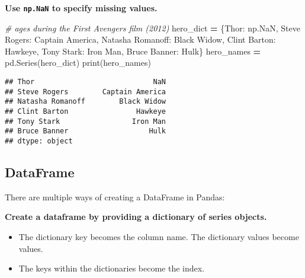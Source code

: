 \documentclass[
]{book}
\newenvironment{Shaded}{\begin{snugshade}}{\end{snugshade}}
\newcommand{\BuiltInTok}[1]{#1}
\newcommand{\CommentTok}[1]{\textcolor[rgb]{0.56,0.35,0.01}{\textit{#1}}}
\newcommand{\NormalTok}[1]{#1}
\newcommand{\OperatorTok}[1]{\textcolor[rgb]{0.81,0.36,0.00}{\textbf{#1}}}
\newcommand{\StringTok}[1]{\textcolor[rgb]{0.31,0.60,0.02}{#1}}
\begin{document}
\textbf{Use \texttt{np.NaN} to specify missing values.}

\begin{Shaded}
\begin{Highlighting}[]
\CommentTok{\# ages during the First Avengers film (2012)}
\NormalTok{hero\_dict }\OperatorTok{=}\NormalTok{ \{}\StringTok{\textquotesingle{}Thor\textquotesingle{}}\NormalTok{: np.NaN,}
\StringTok{\textquotesingle{}Steve Rogers\textquotesingle{}}\NormalTok{: }\StringTok{\textquotesingle{}Captain America\textquotesingle{}}\NormalTok{,}
\StringTok{\textquotesingle{}Natasha Romanoff\textquotesingle{}}\NormalTok{: }\StringTok{\textquotesingle{}Black Widow\textquotesingle{}}\NormalTok{,}
\StringTok{\textquotesingle{}Clint Barton\textquotesingle{}}\NormalTok{: }\StringTok{\textquotesingle{}Hawkeye\textquotesingle{}}\NormalTok{,}
\StringTok{\textquotesingle{}Tony Stark\textquotesingle{}}\NormalTok{: }\StringTok{\textquotesingle{}Iron Man\textquotesingle{}}\NormalTok{,}
\StringTok{\textquotesingle{}Bruce Banner\textquotesingle{}}\NormalTok{: }\StringTok{\textquotesingle{}Hulk\textquotesingle{}}\NormalTok{\}}
\NormalTok{hero\_names }\OperatorTok{=}\NormalTok{ pd.Series(hero\_dict)}
\BuiltInTok{print}\NormalTok{(hero\_names)}
\end{Highlighting}
\end{Shaded}

\begin{verbatim}
## Thor                            NaN
## Steve Rogers        Captain America
## Natasha Romanoff        Black Widow
## Clint Barton                Hawkeye
## Tony Stark                 Iron Man
## Bruce Banner                   Hulk
## dtype: object
\end{verbatim}

\hypertarget{dataframe}{%
\subsection{DataFrame}\label{dataframe}}

There are multiple ways of creating a DataFrame in Pandas:

\textbf{Create a dataframe by providing a dictionary of series objects.}

\begin{itemize}
\item
  The dictionary key becomes the column name. The dictionary values become values.
\item
  The keys within the dictionaries become the index.
\end{itemize}
\end{document}
